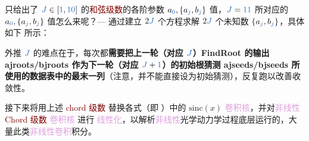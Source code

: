  只给出了 $\textcolor{NavyBlue}{J} \in \left[ \textcolor{NavyBlue}{1}, \textcolor{NavyBlue}{10} \right]$ 的\textcolor{Maroon}{和弦级数}的各阶参数 $a_{\textcolor{NavyBlue}{0}}, \left\{ a_{\textcolor{NavyBlue}{j}}, b_{\textcolor{NavyBlue}{j}} \right\}$ 值，$\textcolor{NavyBlue}{J} = \textcolor{NavyBlue}{11}$ 所对应的 $a_{\textcolor{NavyBlue}{0}}, \left\{ a_{\textcolor{NavyBlue}{j}}, b_{\textcolor{NavyBlue}{j}} \right\}$ 值怎么来呢？--- 通过建立 $2\textcolor{NavyBlue}{J}$ 个方程求解 $2\textcolor{NavyBlue}{J}$ 个未知数 $\left\{ a_{\textcolor{NavyBlue}{j}}, b_{\textcolor{NavyBlue}{j}} \right\}$，具体如下  所示：
\begin{table}[htbp]
	\centering
\end{table}
外推 $\textcolor{NavyBlue}{J}$ 的难点在于，每次都\textbf{需要把上一轮（对应 $\textcolor{NavyBlue}{J}$）FindRoot 的输出 ajroots/bjroots 作为下一轮（对应 $\textcolor{NavyBlue}{J} + \textcolor{NavyBlue}{1}$）的初始根猜测 ajseeds/bjseeds 所使用的数据表中的最末一列}（注意，并不能直接设为初始猜测），反复跑以改善收敛性。

接下来将用上述 \textcolor{Maroon}{chord 级数} 替换各式（即 ）中的 $\text{sinc} \left( x \right)$ \textcolor{Plum}{卷积核}，并对\textcolor{Plum}{非线性} \textcolor{Maroon}{Chord 级数} \textcolor{Plum}{卷积核} 进行 \textcolor{Plum}{线性化}，以解析\textcolor{Plum}{非线性}光学\textcolor{NavyBlue}{动力学过程}底层运行的，大量此类\textcolor{Plum}{非线性卷积}积分。

